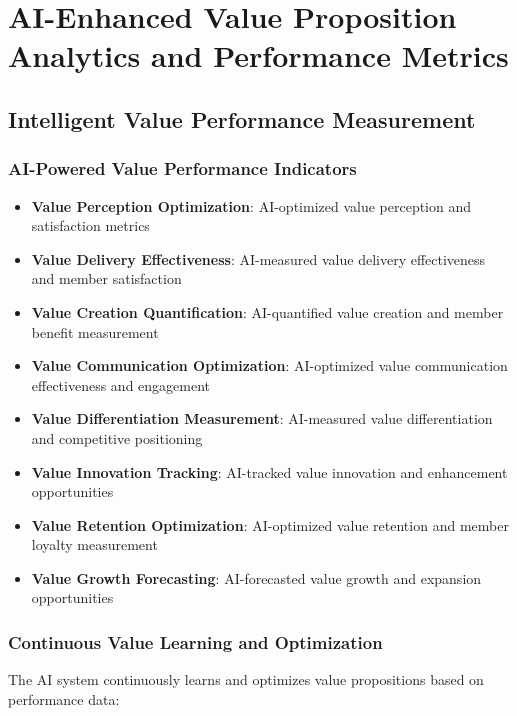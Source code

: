 \section{AI-Enhanced Value Proposition Analytics and Performance Metrics}

\subsection{Intelligent Value Performance Measurement}

\subsubsection{AI-Powered Value Performance Indicators}

\begin{itemize}
    \item \textbf{Value Perception Optimization}: AI-optimized value perception and satisfaction metrics
    \item \textbf{Value Delivery Effectiveness}: AI-measured value delivery effectiveness and member satisfaction
    \item \textbf{Value Creation Quantification}: AI-quantified value creation and member benefit measurement
    \item \textbf{Value Communication Optimization}: AI-optimized value communication effectiveness and engagement
    \item \textbf{Value Differentiation Measurement}: AI-measured value differentiation and competitive positioning
    \item \textbf{Value Innovation Tracking}: AI-tracked value innovation and enhancement opportunities
    \item \textbf{Value Retention Optimization}: AI-optimized value retention and member loyalty measurement
    \item \textbf{Value Growth Forecasting}: AI-forecasted value growth and expansion opportunities
\end{itemize}

\subsubsection{Continuous Value Learning and Optimization}

The AI system continuously learns and optimizes value propositions based on performance data:

